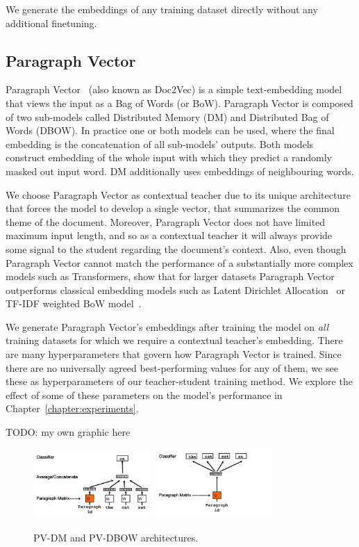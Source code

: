 We generate the embeddings of any training dataset directly without any
additional finetuning.

\subsection{Paragraph Vector}

Paragraph Vector~\cite{le2014distributed} (also known as Doc2Vec) is a simple
text-embedding model that views the input as a Bag of Words (or BoW). Paragraph
Vector is composed of two sub-models called Distributed Memory (DM) and
Distributed Bag of Words (DBOW). In practice one or both models can be used,
where the final embedding is the concatenation of all sub-models' outputs. Both
models construct embedding of the whole input with which they predict a
randomly masked out input word. DM additionally uses embeddings of neighbouring
words.

We choose Paragraph Vector as contextual teacher due to its unique architecture
that forces the model to develop a single vector, that summarizes the common
theme of the document. Moreover, Paragraph Vector does not have limited maximum
input length, and so as a contextual teacher it will always provide some signal
to the student regarding the document's context. Also, even though Paragraph
Vector cannot match the performance of a substantially more complex models such
as Transformers, \cite{dai2015document} show that for larger datasets Paragraph
Vector outperforms classical embedding models such as Latent Dirichlet
Allocation~\citep{blei2003latent} or TF-IDF weighted BoW
model~\citep{harris1954distributional}.

We generate Paragraph Vector's embeddings after training the model on
\emph{all} training datasets for which we require a contextual teacher's
embedding. There are many hyperparameters that govern how Paragraph Vector is
trained. Since there are no universally agreed best-performing values for any
of them, we see these as hyperparameters of our teacher-student training
method. We explore the effect of some of these parameters on the model's
performance in Chapter~\ref{chapter:experiments}.

TODO: my own graphic here

\begin{figure}[h]
    \centering
    \includegraphics[width=0.4\textwidth]{./img/pv-dm.png}
    \includegraphics[width=0.4\textwidth]{./img/pv-dbow.png}
    \caption{PV-DM and PV-DBOW architectures.\label{fig:pv-dm_pv-dbow}}
\end{figure}
